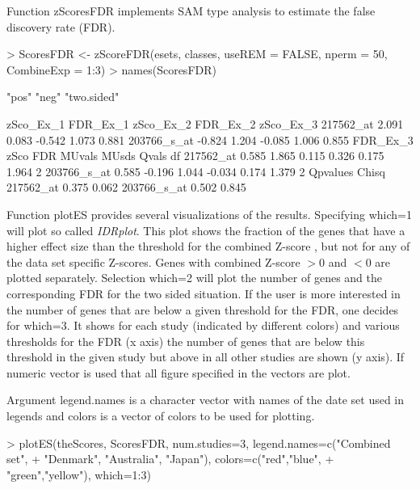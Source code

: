 \documentclass[a4paper]{report}
\begin{document}
Function {\ttfamily zScoresFDR} implements SAM \cite{SAM} type analysis to estimate the false discovery rate (FDR). 
\begin{Schunk}
\begin{Sinput}
> ScoresFDR <- zScoreFDR(esets, classes, useREM = FALSE, nperm = 50, CombineExp = 1:3)
> names(ScoresFDR) 
\end{Sinput}
\begin{Soutput}
[1] "pos"       "neg"       "two.sided"
\end{Soutput}
\begin{Soutput}
            zSco_Ex_1 FDR_Ex_1 zSco_Ex_2 FDR_Ex_2 zSco_Ex_3
217562_at       2.091    0.083    -0.542    1.073     0.881
203766_s_at    -0.824    1.204    -0.085    1.006     0.855
            FDR_Ex_3   zSco   FDR MUvals MUsds Qvals df
217562_at      0.585  1.865 0.115  0.326 0.175 1.964  2
203766_s_at    0.585 -0.196 1.044 -0.034 0.174 1.379  2
            Qpvalues Chisq
217562_at      0.375 0.062
203766_s_at    0.502 0.845
\end{Soutput}
\end{Schunk}
Function {\ttfamily plotES} provides several visualizations of the results. Specifying {\ttfamily which=1} will plot so called \emph{IDRplot}. This plot shows the fraction of the genes that have a higher effect size than the threshold for the combined Z-score , but not for any of the data set specific Z-scores. Genes with combined Z-score $>0$ and $<0$ are plotted separately. Selection {\ttfamily which=2} will plot the number of genes and the corresponding FDR for the two sided situation. If the user is more interested in the number of genes that are below a given threshold for the FDR, one decides for {\ttfamily which=3}. It shows for each study (indicated by different colors) and various thresholds for the FDR (x axis) the number of genes that are below this threshold in the given study but above in all other studies are shown (y axis). If numeric vector is used that all figure specified in the vectors are plot. \par
Argument {\ttfamily legend.names} is a character vector with names of the date set used in legends and {\ttfamily colors} is a vector of colors to be used for plotting.
\begin{Schunk}
\begin{Sinput}
> plotES(theScores, ScoresFDR, num.studies=3, legend.names=c("Combined set",
+  "Denmark", "Australia", "Japan"), colors=c("red","blue",
+  "green","yellow"), which=1:3)
\end{Sinput}
\end{Schunk}
\end{document}
